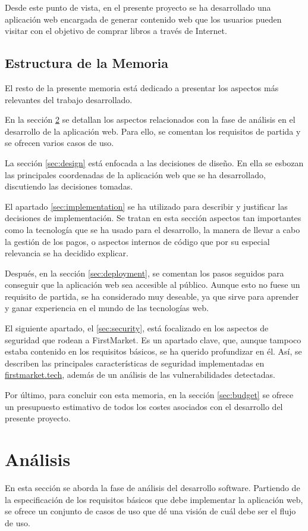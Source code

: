 \documentclass[a4paper,12pt,twoside,openright]{report}
\begin{document}
    Desde este punto de vista, en el presente proyecto se ha desarrollado una aplicación web encargada de generar contenido web que los usuarios pueden visitar con el objetivo de comprar libros a través de Internet.

    \section{Estructura de la Memoria}
    El resto de la presente memoria está dedicado a presentar los aspectos más relevantes del trabajo desarrollado.
    
    En la sección \ref{sec:analysis} se detallan los aspectos relacionados con la fase de análisis en el desarrollo de la aplicación web. Para ello, se comentan los requisitos de partida y se ofrecen varios casos de uso.
    
    La sección \ref{sec:design} está enfocada a las decisiones de diseño. En ella se esbozan las principales coordenadas de la aplicación web que se ha desarrollado, discutiendo las decisiones tomadas.
    
    El apartado \ref{sec:implementation} se ha utilizado para describir y justificar las decisiones de implementación. Se tratan en esta sección aspectos tan importantes como la tecnología que se ha usado para el desarrollo, la manera de llevar a cabo la gestión de los pagos, o aspectos internos de código que por su especial relevancia se ha decidido explicar.
    
    Después, en la sección \ref{sec:deployment}, se comentan los pasos seguidos para conseguir que la aplicación web sea accesible al público. Aunque esto no fuese un requisito de partida, se ha considerado muy deseable, ya que sirve para aprender y ganar experiencia en el mundo de las tecnologías web.
    
    El siguiente apartado, el \ref{sec:security}, está focalizado en los aspectos de seguridad que rodean a FirstMarket. Es un apartado clave, que, aunque tampoco estaba contenido en los requisitos básicos, se ha querido profundizar en él. Así, se describen las principales características de seguridad implementadas en \href{https://firstmarket.tech}{firstmarket.tech}, además de un análisis de las vulnerabilidades detectadas.
    
    Por último, para concluir con esta memoria, en la sección \ref{sec:budget} se ofrece un presupuesto estimativo de todos los costes asociados con el desarrollo del presente proyecto.
    
    \chapter{Análisis} \label{sec:analysis}
    En esta sección se aborda la fase de análisis del desarrollo software. Partiendo de la especificación de los requisitos básicos que debe implementar la aplicación web, se ofrece un conjunto de casos de uso que dé una visión de cuál debe ser el flujo de uso.
    
\end{document}
